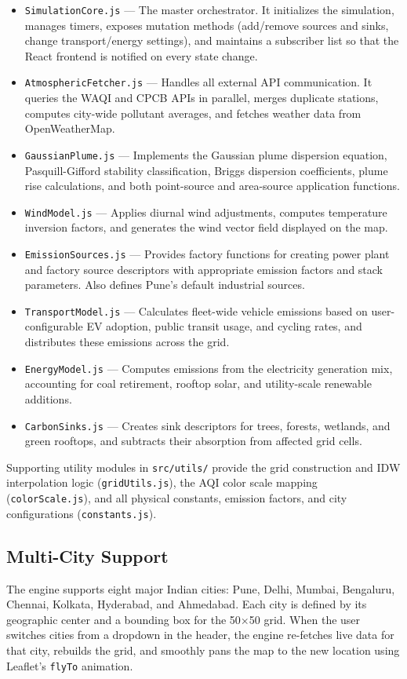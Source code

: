 \documentclass[a4paper, 12pt]{report}
\begin{document}
\begin{itemize}
\item \texttt{SimulationCore.js} --- The master orchestrator. It initializes the simulation, manages timers, exposes mutation methods (add/remove sources and sinks, change transport/energy settings), and maintains a subscriber list so that the React frontend is notified on every state change.
\item \texttt{AtmosphericFetcher.js} --- Handles all external API communication. It queries the WAQI and CPCB APIs in parallel, merges duplicate stations, computes city-wide pollutant averages, and fetches weather data from OpenWeatherMap.
\item \texttt{GaussianPlume.js} --- Implements the Gaussian plume dispersion equation, Pasquill-Gifford stability classification, Briggs dispersion coefficients, plume rise calculations, and both point-source and area-source application functions.
\item \texttt{WindModel.js} --- Applies diurnal wind adjustments, computes temperature inversion factors, and generates the wind vector field displayed on the map.
\item \texttt{EmissionSources.js} --- Provides factory functions for creating power plant and factory source descriptors with appropriate emission factors and stack parameters. Also defines Pune's default industrial sources.
\item \texttt{TransportModel.js} --- Calculates fleet-wide vehicle emissions based on user-configurable EV adoption, public transit usage, and cycling rates, and distributes these emissions across the grid.
\item \texttt{EnergyModel.js} --- Computes emissions from the electricity generation mix, accounting for coal retirement, rooftop solar, and utility-scale renewable additions.
\item \texttt{CarbonSinks.js} --- Creates sink descriptors for trees, forests, wetlands, and green rooftops, and subtracts their absorption from affected grid cells.
\end{itemize}

Supporting utility modules in \texttt{src/utils/} provide the grid construction and IDW interpolation logic (\texttt{gridUtils.js}), the AQI color scale mapping (\texttt{colorScale.js}), and all physical constants, emission factors, and city configurations (\texttt{constants.js}).

\subsection{Multi-City Support}
The engine supports eight major Indian cities: Pune, Delhi, Mumbai, Bengaluru, Chennai, Kolkata, Hyderabad, and Ahmedabad. Each city is defined by its geographic center and a bounding box for the 50$\times$50 grid. When the user switches cities from a dropdown in the header, the engine re-fetches live data for that city, rebuilds the grid, and smoothly pans the map to the new location using Leaflet's \texttt{flyTo} animation.
\end{document}

